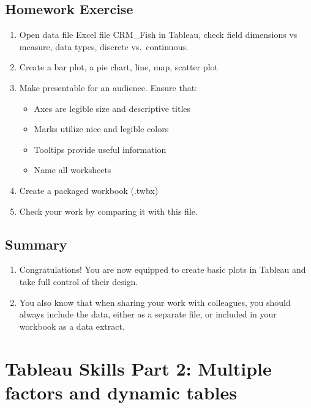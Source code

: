 \documentclass[
]{book}
\providecommand{\tightlist}{%
  \setlength{\itemsep}{0pt}\setlength{\parskip}{0pt}}
\begin{document}
\hypertarget{homework-exercise}{%
\subsection{Homework Exercise}\label{homework-exercise}}

\begin{enumerate}
\def\labelenumi{\arabic{enumi}.}
\tightlist
\item
  Open data file Excel file CRM\_Fish in Tableau, check field dimensions vs measure, data types, discrete vs.~continuous.
\item
  Create a bar plot, a pie chart, line, map, scatter plot
\item
  Make presentable for an audience. Ensure that:

  \begin{itemize}
  \tightlist
  \item
    Axes are legible size and descriptive titles
  \item
    Marks utilize nice and legible colors
  \item
    Tooltips provide useful information
  \item
    Name all worksheets
  \end{itemize}
\item
  Create a packaged workbook (.twbx)
\item
  Check your work by comparing it with this file.
\end{enumerate}

\hypertarget{summary-2}{%
\subsection{Summary}\label{summary-2}}

\begin{enumerate}
\def\labelenumi{\arabic{enumi}.}
\tightlist
\item
  Congratulations! You are now equipped to create basic plots in Tableau and take full control of their design.
\item
  You also know that when sharing your work with colleagues, you should always include the data, either as a separate file, or included in your workbook as a data extract.
\end{enumerate}

\hypertarget{tableau-skills-part-2-multiple-factors-and-dynamic-tables}{%
\section{Tableau Skills Part 2: Multiple factors and dynamic tables}\label{tableau-skills-part-2-multiple-factors-and-dynamic-tables}}
\end{document}

